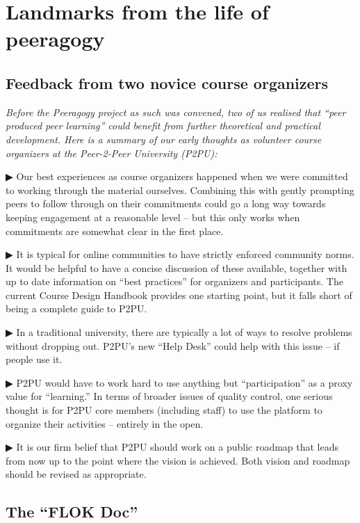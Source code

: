 \section{Landmarks from the life of
peeragogy}\label{landmarks-from-the-life-of-peeragogy}

\subsection{Feedback from two novice course
organizers}\label{feedback-from-two-novice-course-organizers}

\emph{Before the Peeragogy project as such was convened, two of us
realised that ``peer produced peer learning'' could benefit from further
theoretical and practical development. Here is a summary of our early
thoughts as volunteer course organizers at the Peer-2-Peer University
(P2PU):}

▶ Our best experiences as course organizers happened when we were
committed to working through the material ourselves. Combining this with
gently prompting peers to follow through on their commitments could go a
long way towards keeping engagement at a reasonable level -- but this
only works when commitments are somewhat clear in the first place.

▶ It is typical for online communities to have strictly enforced
community norms. It would be helpful to have a concise discussion of
these available, together with up to date information on ``best
practices'' for organizers and participants. The current Course Design
Handbook provides one starting point, but it falls short of being a
complete guide to P2PU.

▶ In a traditional university, there are typically a lot of ways to
resolve problems without dropping out. P2PU's new ``Help Desk'' could
help with this issue -- if people use it.

▶ P2PU would have to work hard to use anything but ``participation'' as
a proxy value for ``learning.'' In terms of broader issues of quality
control, one serious thought is for P2PU core members (including staff)
to use the platform to organize their activities -- entirely in the
open.

▶ It is our firm belief that P2PU should work on a public roadmap that
leads from now up to the point where the vision is achieved. Both vision
and roadmap should be revised as appropriate.

\subsection{The ``FLOK Doc''}\label{the-flok-doc}

